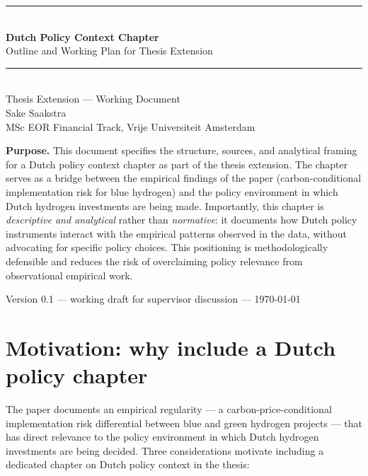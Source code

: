\documentclass[11pt,a4paper]{article}
\begin{document}
\begin{titlepage}
  \centering
  \vspace*{1.5cm}
  {\color{boxborder}\rule{\linewidth}{1.5pt}}\\[0.3cm]
  {\Huge\bfseries Dutch Policy Context Chapter}\\[0.3cm]
  {\Large Outline and Working Plan for Thesis Extension}\\[0.3cm]
  {\color{boxborder}\rule{\linewidth}{1pt}}\\[1.5cm]

  {\large Thesis Extension --- Working Document}\\[0.3cm]
  {\normalsize Sake Saakstra}\\[0.2cm]
  {\normalsize MSc EOR Financial Track, Vrije Universiteit Amsterdam}\\[2cm]

  \begin{tcolorbox}[colback=boxbg, colframe=boxborder, boxrule=0.6pt, arc=2mm, width=0.85\textwidth]
    \textbf{Purpose.} This document specifies the structure, sources, and analytical framing for a Dutch policy context chapter as part of the thesis extension. The chapter serves as a bridge between the empirical findings of the paper (carbon-conditional implementation risk for blue hydrogen) and the policy environment in which Dutch hydrogen investments are being made. Importantly, this chapter is \emph{descriptive and analytical} rather than \emph{normative}: it documents how Dutch policy instruments interact with the empirical patterns observed in the data, without advocating for specific policy choices. This positioning is methodologically defensible and reduces the risk of overclaiming policy relevance from observational empirical work.
  \end{tcolorbox}

  \vfill
  {\normalsize Version 0.1 --- working draft for supervisor discussion --- \today}
\end{titlepage}

\tableofcontents
\newpage

\section{Motivation: why include a Dutch policy chapter}

The paper documents an empirical regularity --- a carbon-price-conditional implementation risk differential between blue and green hydrogen projects --- that has direct relevance to the policy environment in which Dutch hydrogen investments are being decided. Three considerations motivate including a dedicated chapter on Dutch policy context in the thesis:
\end{document}
